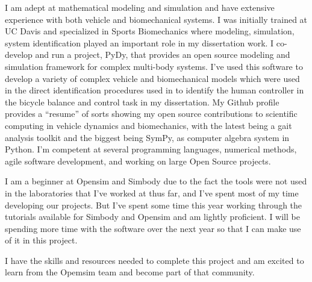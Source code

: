 \documentclass[11pt]{article}
\begin{document}
I am adept at mathematical modeling and simulation and have extensive
experience with both vehicle and biomechanical systems. I was initially trained
at UC Davis and specialized in Sports Biomechanics where modeling, simulation,
system identification played an important role in my dissertation work. I
co-develop and run a project, PyDy, that provides an open source modeling and
simulation framework for complex multi-body systems. I've used this software to
develop a variety of complex vehicle and biomechanical models which were used
in the direct identification procedures used in to identify the human
controller in the bicycle balance and control task in my dissertation. My
Github profile provides a ``resume'' of sorts showing my open source
contributions to scientific computing in vehicle dynamics and biomechanics,
with the latest being a gait analysis toolkit and the biggest being SymPy, as
computer algebra system in Python. I'm competent at several programming
languages, numerical methods, agile software development, and working on large
Open Source projects.

I am a beginner at Opensim and Simbody due to the fact the tools were not used
in the laboratories that I've worked at thus far, and I've spent most of my
time developing our projects. But I've spent some time this year working
through the tutorials available for Simbody and Opensim and am lightly
proficient. I will be spending more time with the software over the next year
so that I can make use of it in this project.

I have the skills and resources needed to complete this project and am excited
to learn from the Opemsim team and become part of that community.



\end{document}
